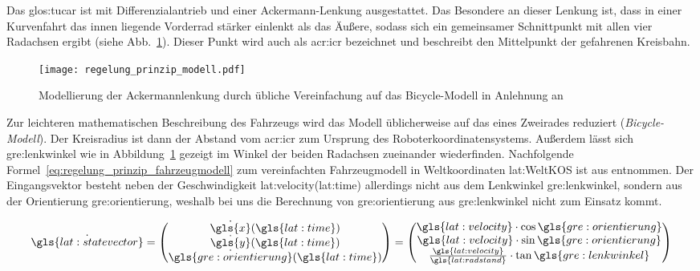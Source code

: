 Das \gls{glos:tucar} ist mit Differenzialantrieb und einer Ackermann-Lenkung ausgestattet. Das Besondere an dieser Lenkung ist, dass in einer Kurvenfahrt das innen liegende Vorderrad stärker einlenkt als das Äußere, sodass sich ein gemeinsamer Schnittpunkt mit allen vier Radachsen ergibt (siehe Abb.~\ref{fig:regelung_prinzip_modell}). Dieser Punkt wird auch als \gls{acr:icr} bezeichnet und beschreibt den Mittelpunkt der gefahrenen Kreisbahn. 

\begin{figure}[htbp] %
  \centering
  \texttt{[image: regelung\_prinzip\_modell.pdf]}
  \caption{Modellierung der Ackermannlenkung durch übliche Vereinfachung auf das Bicycle-Modell in Anlehnung an \autocite{corkeRoboticsVisionControl2017}}
  \label{fig:regelung_prinzip_modell}
\end{figure}

Zur leichteren mathematischen Beschreibung des Fahrzeugs wird das Modell üblicherweise auf das eines Zweirades reduziert (\emph{Bicycle-Modell}). Der Kreisradius ist dann der Abstand vom \gls{acr:icr} zum Ursprung des Roboterkoordinatensystems. Außerdem lässt sich \gls{gre:lenkwinkel} wie in Abbildung~\ref{fig:regelung_prinzip_modell} gezeigt im Winkel der beiden Radachsen zueinander wiederfinden. Nachfolgende Formel~\eqref{eq:regelung_prinzip_fahrzeugmodell} zum vereinfachten Fahrzeugmodell in Weltkoordinaten \gls{lat:WeltKOS} ist aus \autocite{corkeRoboticsVisionControl2017} entnommen. Der Eingangsvektor besteht neben der Geschwindigkeit \gls{lat:velocity}(\gls{lat:time}) allerdings nicht aus dem Lenkwinkel \gls{gre:lenkwinkel}, sondern aus der Orientierung \gls{gre:orientierung}, weshalb bei uns die Berechnung von \gls{gre:orientierung} aus \gls{gre:lenkwinkel} nicht zum Einsatz kommt. 

\begin{equation}
\dot{\gls{lat:statevector}} = 
\begin{pmatrix}
\dot{\gls{x}}(\gls{lat:time}) 	\\
\dot{\gls{y}}(\gls{lat:time})	\\
\dot{\gls{gre:orientierung}}(\gls{lat:time})    	\\
\end{pmatrix}
=
\begin{pmatrix}
\gls{lat:velocity} \cdot \cos \gls{gre:orientierung} 	\\
\gls{lat:velocity} \cdot \sin \gls{gre:orientierung} 	\\
\frac{\gls{lat:velocity}}{\gls{lat:radstand}} \cdot \tan \gls{gre:lenkwinkel}    	\\
\end{pmatrix}
\label{eq:regelung_prinzip_fahrzeugmodell}
\end{equation} 

